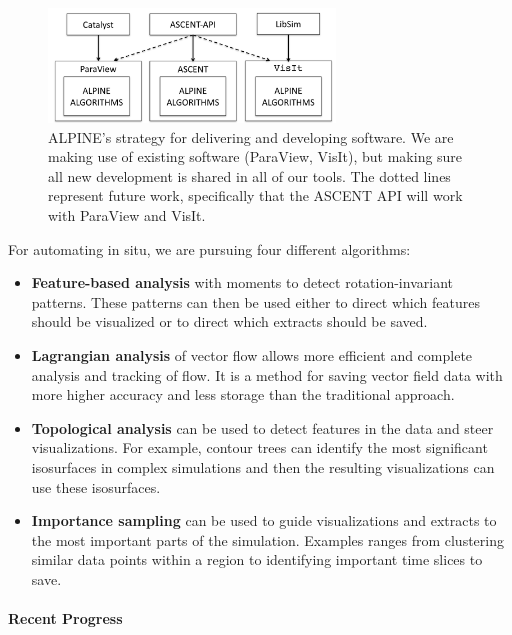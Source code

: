 \begin{figure}[htb]
	\centering
	\includegraphics[width=3in]{projects/2.3.4-DataViz/2.3.4.16-ALPINE-ZFP/alpine_infrastructure.png}
	\caption{\label{fig:alpine_infrastructure}ALPINE's strategy for delivering and developing software.  We are making use of existing software (ParaView, VisIt), but making sure all new development is shared in all of our tools.  The dotted lines represent future work, specifically that the ASCENT API will work with ParaView and VisIt.}
\end{figure}

For automating in situ, we are pursuing four different algorithms:
\begin{itemize}
        \setlength{\itemsep}{1pt}
        \setlength{\parskip}{0pt}
        \setlength{\parsep}{0pt}
\item \textbf{Feature-based analysis} with moments to detect rotation-invariant patterns.  These patterns can then be used either to direct which features should be visualized or to direct which extracts should be saved.
\item \textbf{Lagrangian analysis} of vector flow allows more efficient and complete analysis and tracking of flow.  It is a method for saving vector field data with more higher accuracy and less storage than the traditional approach.
\item \textbf{Topological analysis} can be used to detect features in the data and steer visualizations.  For example, contour trees can identify the most significant isosurfaces in complex simulations and then the resulting visualizations can use these isosurfaces.
\item \textbf{Importance sampling} can be used to guide visualizations and extracts to the most important parts of the simulation.  Examples ranges from clustering similar data points within a region to identifying important time slices to save.
\end{itemize}




\paragraph{Recent Progress}

